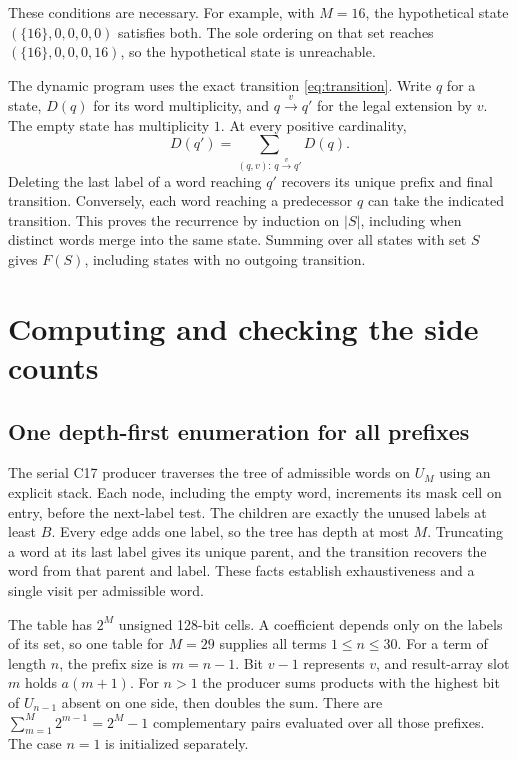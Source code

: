 \documentclass[11pt]{article}
\begin{document}
These conditions are necessary. For example, with \(M=16\), the hypothetical
state \((\{16\},0,0,0,0)\) satisfies both. The sole ordering on that
set reaches \((\{16\},0,0,0,16)\), so the hypothetical state is unreachable.

The dynamic program uses the exact transition \eqref{eq:transition}.
Write \(q\) for a state, \(D(q)\) for its word multiplicity, and
\(q\xrightarrow{v}q'\) for the legal extension by \(v\). The empty
state has multiplicity \(1\). At every positive cardinality,
\[
 D(q')=\sum_{(q,v):\,q\xrightarrow{v}q'}D(q).
\]
Deleting the last label of a word reaching \(q'\) recovers its
unique prefix and final transition. Conversely, each word reaching a
predecessor \(q\) can take the indicated transition. This proves the
recurrence by induction on \(|S|\), including when distinct words
merge into the same state. Summing over all states with set \(S\)
gives \(F(S)\), including states with no outgoing transition.

\section{Computing and checking the side counts}

\subsection{One depth-first enumeration for all prefixes}

The serial C17 producer traverses the tree of admissible words on
\(U_M\) using an explicit stack. Each node, including the empty word,
increments its mask cell on entry, before the next-label test. The
children are exactly the unused labels at least \(B\).
Every edge adds one label, so the tree has depth at most \(M\).
Truncating a word at its last label gives its unique parent, and the
transition recovers the word from that parent and label. These facts
establish exhaustiveness and a single visit per admissible word.

The table has \(2^M\) unsigned 128-bit cells. A coefficient depends
only on the labels of its set, so one table for \(M=29\) supplies
all terms \(1\leq n\leq30\). For a term of length \(n\), the prefix
size is \(m=n-1\). Bit \(v-1\) represents \(v\), and result-array
slot \(m\) holds \(a(m+1)\).
For \(n>1\) the producer sums products with the highest bit of
\(U_{n-1}\) absent on one side, then doubles the sum. There are
\(\sum_{m=1}^{M}2^{m-1}=2^M-1\) complementary pairs evaluated over
all those prefixes. The case \(n=1\) is initialized separately.
\end{document}
